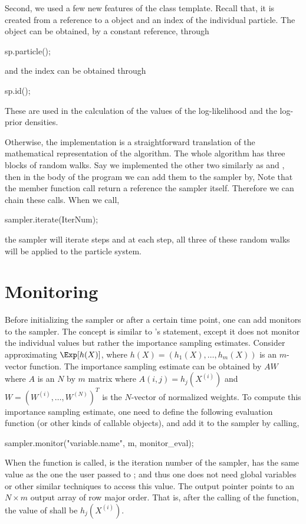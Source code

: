 Second, we used a few new features of the  class
template. Recall that, it is created from a reference to a
 object and an index of the individual particle. The
 object can be obtained, by a constant reference,
through
\begin{cppcode}
sp.particle();
\end{cppcode}
and the index can be obtained through
\begin{cppcode}
sp.id();
\end{cppcode}
These are used in the calculation of the values of the log-likelihood and the
log-prior densities.

Otherwise, the implementation is a straightforward translation of the
mathematical representation of the algorithm. The whole algorithm has three
blocks of random walks. Say we implemented the other two similarly as
 and , then in the body
of the program we can add them to the sampler by,
Note that the  member function call return a reference the
sampler itself. Therefore we can chain these calls. When we call,
\begin{cppcode}
sampler.iterate(IterNum);
\end{cppcode}
the sampler will iterate  steps and at each step, all three
of these random walks will be applied to the particle system.

\section{Monitoring}
\label{sec:Monitoring}

Before initializing the sampler or after a certain time point, one can add
monitors to the sampler. The concept is similar to \bugs's 
statement, except it does not monitor the individual values but rather the
importance sampling estimates. Consider approximating $\Exp[h(X)]$, where
$h(X) = (h_1(X),\dots,h_m(X))$ is an $m$-vector function. The importance
sampling estimate can be obtained by $AW$ where $A$ is an $N$ by $m$ matrix
where $A(i,j) = h_j(X^{(i)})$ and $W = (W^{(i)},\dots,W^{(N)})^T$ is the
$N$-vector of normalized weights. To compute this importance sampling
estimate, one need to define the following evaluation function (or other kinds
of callable objects),
and add it to the sampler by calling,
\begin{cppcode}
sampler.monitor("variable.name", m, monitor_eval);
\end{cppcode}
When the function  is called,  is the
iteration number of the sampler,  has the same value as the one
the user passed to ; and thus one does not need
global variables or other similar techniques to access this value. The output
pointer  points to an $N \times m$ output array of row major
order. That is, after the calling of the function, the value of
 shall be $h_j(X^{(i)})$.

